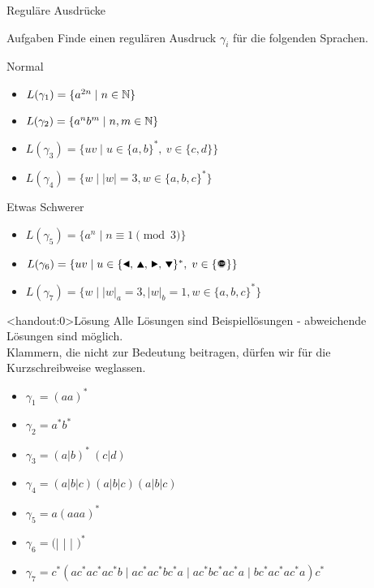 {
\begin{frame}{Reguläre Ausdrücke}
    \begin{alertblock}{Aufgaben}
        Finde einen regulären Ausdruck $\gamma_i$ für die folgenden Sprachen.
    \end{alertblock}
    \begin{block}{Normal}
        \begin{itemize}
            \item $L(\gamma_1) = \{a^{2n} \mid n\in\mathbb{N}\}$
            \item $L(\gamma_2) = \{a^nb^m \mid n, m\in\mathbb{N}\}$
            \item $L(\gamma_3) = \{uv \mid u\in\{a,b\}^\ast,\ v\in\{c,d\}\}$
            \item $L(\gamma_4) = \{w \mid |w| = 3, w\in \{a,b,c\}^*\}$
        \end{itemize}
    \end{block}
    \begin{block}{Etwas Schwerer}
        \begin{itemize}
            \item $L(\gamma_5) = \{a^n \mid n \equiv 1 \pmod 3\}$
            \item $L(\gamma_6) = \{uv\mid u\in\{\text{\Rewind, \MoveUp, \Forward, \MoveDown}\}^\ast,\;v\in\{\text{\Stopsign}\}\}$
            \item $L(\gamma_7) = \{w \mid |w|_a = 3, |w|_b = 1, w\in \{a,b,c\}^*\}$
        \end{itemize}
    \end{block}
\end{frame}
}

{
\begin{frame}<handout:0>{Lösung}
    Alle Lösungen sind Beispiellösungen - abweichende Lösungen sind möglich.\\
    Klammern, die nicht zur Bedeutung beitragen, dürfen wir für die Kurzschreibweise weglassen.
    \begin{itemize}[<+- | alert@+>]
        \item $\gamma_1 = (aa)^*$
        \item $\gamma_2 = a^*b^*$
        \item $\gamma_3 = (a|b)^*\ (c|d)$
        \item $\gamma_4 = (a|b|c)(a|b|c)(a|b|c)$
        \item $\gamma_5 = a(aaa)^*$
        \item $\gamma_6 = ($\Rewind | \MoveUp | \Forward | \MoveDown$)^*$\Stopsign
        \item $\gamma_7 = c^*(ac^*ac^*ac^*b\mid ac^*ac^*bc^*a\mid ac^*bc^*ac^*a\mid bc^*ac^*ac^*a)c^*$
    \end{itemize}
\end{frame}
}

